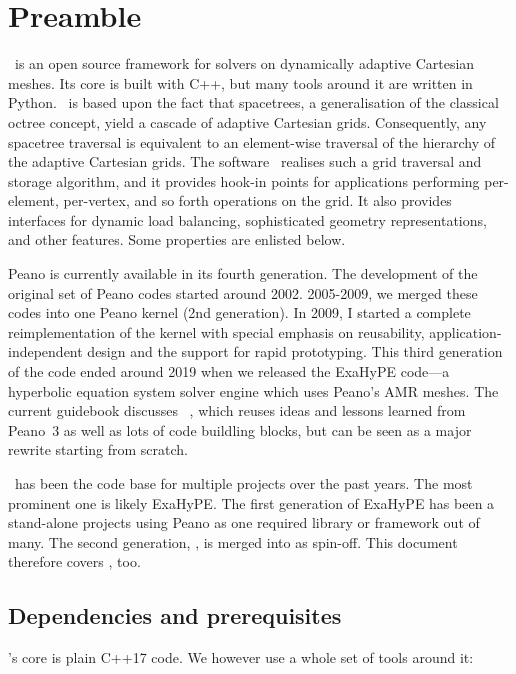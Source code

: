\chapter{Preamble}


\Peano\ is an open source framework for solvers on dynamically adaptive
Cartesian meshes.
Its core is built with C++, but many tools around it are written in Python.
\Peano\  is based upon the fact that spacetrees, a generalisation of the classical octree concept, yield a cascade of adaptive Cartesian grids. Consequently, any spacetree traversal is equivalent to an element-wise traversal of the hierarchy of the adaptive Cartesian grids. The software \Peano\  realises such a grid traversal and storage algorithm, and it provides hook-in points for applications performing per-element, per-vertex, and so forth operations on the grid. It also provides interfaces for dynamic load balancing, sophisticated geometry representations, and other features. Some properties are enlisted below.

Peano is currently available in its fourth generation. 
The development of the original set of Peano codes started around 2002.
2005-2009, we merged these codes into one Peano kernel (2nd generation). 
In 2009, I started a complete reimplementation of the kernel with special
emphasis on reusability, application-independent design and the support for rapid prototyping. 
This third generation of the code ended around 2019 when we released the
ExaHyPE code---a hyperbolic equation system solver engine which uses Peano's
AMR meshes.
The current guidebook discusses \Peano\ , which reuses ideas and lessons learned
from Peano~3 as well as lots of code buildling blocks, but can be seen as a
major rewrite starting from scratch.



\Peano\ has been the code base for multiple projects over the past years.
The most prominent one is likely ExaHyPE.
The first generation of ExaHyPE has been a stand-alone projects using Peano
as one required library or framework out of many.
The second generation, \ExaHyPE, is merged into \Peano as spin-off.
This document therefore covers \ExaHyPE, too.




\section*{Dependencies and prerequisites}

\Peano's core is plain C++17 code. 
We however use a whole set of tools around it:

